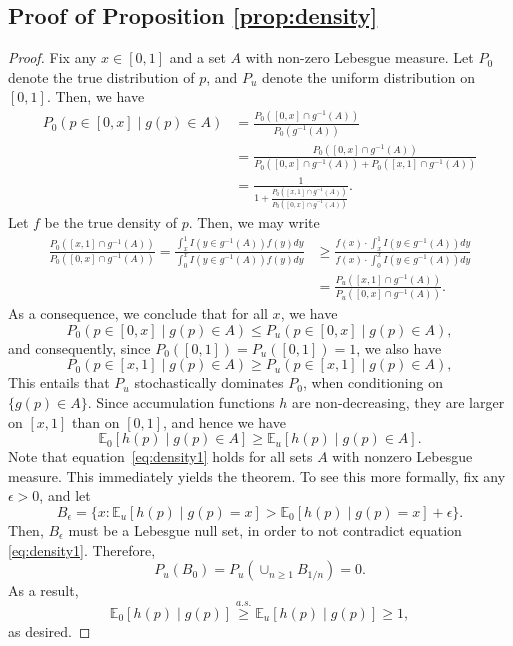 \documentclass{biometrika}
\newcommand{\eps}{\epsilon}
\newcommand{\E}{\mathbb{E}}
\newcommand{\1}{\mathbf{1}}
\begin{document}
\subsection{Proof of Proposition \ref{prop:density}}\label{subapp:proof_proposition_density}
\begin{proof}
Fix any $x\in [0, 1]$ and a set $A$ with non-zero Lebesgue measure. Let $P_0$ denote the true distribution of $p$, and $P_u$ denote the uniform distribution on $[0, 1]$. Then, we have
\begin{align*}
P_0(p\in [0, x] \mid g(p)\in A) &= \frac{P_0([0, x] \cap g^{-1}(A))}{P_0(g^{-1}(A))
}\\
 & = \frac{P_0([0, x] \cap g^{-1}(A))}{P_0([0, x]\cap g^{-1}(A)) + P_0([x, 1]\cap g^{-1}(A))}\\
& = \frac{1}{1 + \frac{P_0([x, 1]\cap g^{-1}(A))}{P_0([0, x]\cap g^{-1}(A))}}.
\end{align*}
Let $f$ be the true density of $p$. Then, we may write 
\begin{align*}
  \frac{P_0([x, 1]\cap g^{-1}(A))}{P_0([0, x]\cap g^{-1}(A))}  = \frac{\int_{x}^{1} I(y\in g^{-1}(A)) f(y)dy}{\int_{0}^{x} I(y\in g^{-1}(A)) f(y)dy} &\ge \frac{f(x) \cdot \int_{x}^{1} I(y\in g^{-1}(A)) dy}{f(x) \cdot \int_{0}^{x}I(y \in g^{-1}(A))dy}\\
& =  \frac{P_u([x, 1]\cap g^{-1}(A))}{P_u([0, x]\cap g^{-1}(A))}.
\end{align*}
As a consequence, we conclude that for all $x$, we have
\[P_0(p\in [0, x] \mid g(p)\in A)\le P_u(p\in [0, x] \mid g(p)\in A),\]
and consequently, since $P_0([0,1]) = P_u([0,1]) = 1$, we also have
\[P_0(p\in [x,1] \mid g(p)\in A) \ge P_u(p\in [x,1] \mid g(p)\in A),\]
This entails that $P_u$ stochastically dominates $P_0$, when conditioning on $\{g(p)\in A\}$. Since accumulation functions $h$ are non-decreasing, they are larger on $[x,1]$ than on $[0,1]$, and hence we have
\begin{equation}\label{eq:density1}
\E_0[h(p) \mid g(p)\in A] \ge \E_u[h(p) \mid g(p)\in A].
\end{equation} 
Note that equation~\eqref{eq:density1} holds for all sets $A$ with nonzero Lebesgue measure. This immediately yields the theorem. To see this more formally, fix any $\eps > 0$, and let 
\[B_{\eps} = \{x: \E_u[h(p) \mid g(p)=x] > \E_0[h(p) \mid g(p)=x] + \eps\}.\]
Then, $B_{\epsilon}$ must be a Lebesgue null set, in order to not contradict equation \eqref{eq:density1}. 
Therefore, 
\[P_u(B_{0}) = P_u(\cup_{n\ge 1}B_{1/n})= 0.\]
As a result,
\[\E_0[h(p) \mid g(p)]\stackrel{a.s.}{\ge} \E_u[h(p) \mid g(p)]\ge 1,\]
as desired.
\end{proof}
\end{document}

